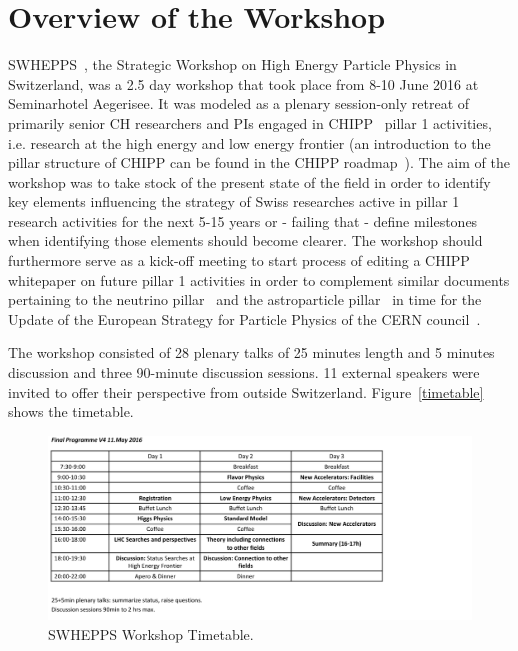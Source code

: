 \section{Overview of the Workshop}\label{Overview}



\noindent SWHEPPS~\cite{workshopindico},  the Strategic Workshop on High Energy Particle Physics in Switzerland, was a 2.5 day workshop that took place from 8-10 June 2016 at 
Seminarhotel Aegerisee.   It was  modeled as a plenary session-only retreat of primarily senior CH researchers and PIs engaged in CHIPP~\cite{chipp} pillar 1 activities, 
i.e. research at the high energy and low energy frontier (an introduction to the pillar structure of CHIPP can be found in the CHIPP roadmap~\cite{roadmap}). The aim  of the workshop
 was to take stock of the present state of the field in order to identify key elements influencing the strategy of Swiss researches active in pillar 1 research activities for the next 5-15 years or
 - failing that - define milestones when identifying those elements should become clearer. The workshop should furthermore serve as a kick-off meeting to start  process of editing a
 CHIPP whitepaper on future pillar 1 activities in order to  complement similar documents pertaining to the neutrino pillar~\cite{neutrinowhitepaper} and the astroparticle 
  pillar~\cite{astroparticlepillarwhitepaper} in time for the Update of the European Strategy for Particle Physics  of the  CERN council~\cite{europeanstrategy}. 


The workshop consisted of 28 plenary talks of 25 minutes length and 5 minutes discussion  and three 90-minute discussion sessions. 11 external speakers were invited to offer
their perspective from outside Switzerland. Figure~\ref{timetable} shows the timetable.

 
\begin{figure}[htb]
  \begin{center}\includegraphics[width=1.1\textwidth]{figures/OverviewTimetable}
    \caption{SWHEPPS Workshop Timetable.}   \label{fig:timetable}
 \end{center}
 \end{figure}

